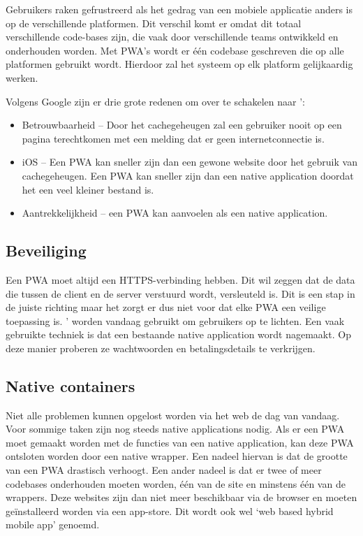 Gebruikers raken gefrustreerd als het gedrag van een mobiele applicatie anders is op de verschillende platformen. Dit verschil komt er omdat dit totaal verschillende code-bases zijn, die vaak door verschillende teams ontwikkeld en onderhouden worden. Met PWA's wordt er één codebase geschreven die op alle platformen gebruikt wordt. Hierdoor zal het systeem op elk platform gelijkaardig werken.
\autocite{Google2019}

Volgens Google zijn er drie grote redenen om over te schakelen naar ':
\begin{itemize}
    \item Betrouwbaarheid – Door het cachegeheugen zal een gebruiker nooit op een pagina terechtkomen met een melding dat er geen internetconnectie is.
    \item iOS – Een PWA kan sneller zijn dan een gewone website door het gebruik van cachegeheugen. Een PWA kan sneller zijn dan een native application doordat het een veel kleiner bestand is.
    \item Aantrekkelijkheid – een PWA kan aanvoelen als een native application.
\end{itemize}
\autocite{GooglePwa2019}

\subsection{Beveiliging}
Een PWA moet altijd een HTTPS-verbinding hebben. Dit wil zeggen dat de data die tussen de client en de server verstuurd wordt, versleuteld is.
\autocite{Durumeric2013}
Dit is een stap in de juiste richting maar het zorgt er dus niet voor dat elke PWA een veilige toepassing is. ' worden vandaag gebruikt om gebruikers op te lichten. Een vaak gebruikte techniek is dat een bestaande native application wordt nagemaakt. Op deze manier proberen ze wachtwoorden en betalingsdetails te verkrijgen.
\autocite{Lee2018}

\subsection{Native containers}
Niet alle problemen kunnen opgelost worden via het web de dag van vandaag. Voor sommige taken zijn nog steeds native applications nodig. Als er een PWA moet gemaakt worden met de functies van een native application, kan deze PWA ontsloten worden door een native wrapper.
Een nadeel hiervan is dat de grootte van een PWA drastisch verhoogt.
Een ander nadeel is dat er twee of meer codebases onderhouden moeten worden, één van de site en minstens één van de wrappers.
Deze websites zijn dan niet meer beschikbaar via de browser en moeten geïnstalleerd worden via een app-store.
Dit wordt ook wel ‘web based hybrid mobile app’ genoemd.
\autocite{Richard2019} \autocite{Malavolta2016}

